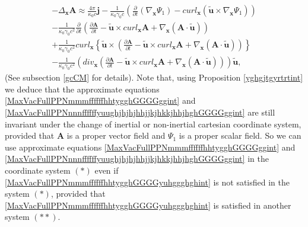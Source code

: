 \documentclass{article}
\theoremstyle{definition}
\theoremstyle{remark}
\renewcommand{\vec}[1]{\mathbf{#1}}
\newcommand{\er}{\eqref}
\newcommand{\er}{\eqref}
\begin{document}
\begin{multline}\label{MaxVacFullPPNnnnffffffyuughjhjhjhhjjkjhkkjhhjhghGGGGggint}
-\Delta_{\vec x}\vec A\approx
%
%
%
\frac{4\pi}{\kappa_0 c}\vec j-\frac{1}{\kappa_0\gamma_0
c}\left(\frac{\partial}{\partial t}\left(\nabla_{\vec
x}\Psi_1\right)-curl_{\vec x}\left(\vec {\tilde u}\times\nabla_{\vec
x}\Psi_1\right)\right)\\-\frac{1}{\kappa_0\gamma_0
c^2}\frac{\partial}{\partial t}\left(\frac{\partial\vec A}{\partial
t}-\vec {\tilde u}\times curl_{\vec x}\vec A+\nabla_{\vec
x}\left(\vec A\cdot\vec {\tilde
u}\right)\right)\\+\frac{1}{\kappa_0\gamma_0 c^2}curl_{\vec x}
\left\{\vec {\tilde u}\times
\left(\frac{\partial\vec A}{\partial t}-\vec {\tilde u}\times
curl_{\vec x}\vec A+\nabla_{\vec x}\left(\vec A\cdot\vec {\tilde
u}\right)\right)\right\}\\-\frac{1}{\kappa_0\gamma_0
c^2}\left(div_{\vec x}\left(\frac{\partial\vec A}{\partial t}-\vec
{\tilde u}\times curl_{\vec x}\vec A+\nabla_{\vec x}\left(\vec
A\cdot\vec {\tilde u}\right)\right)\right)\vec {\tilde u},
\end{multline}
(See subsection \ref{gcCM} for details). Note that, using
Proposition \ref{yghgjtgyrtrtint} we deduce that the approximate
equations \er{MaxVacFullPPNmmmffffffhhtygghGGGGggint} and
\er{MaxVacFullPPNnnnffffffyuughjhjhjhhjjkjhkkjhhjhghGGGGggint} are
still invariant under the change of inertial or non-inertial
cartesian coordinate system, provided that $\vec A$ is a proper
vector field and $\Psi_1$ is a proper scalar field. So we can use
approximate equations \er{MaxVacFullPPNmmmffffffhhtygghGGGGggint}
and \er{MaxVacFullPPNnnnffffffyuughjhjhjhhjjkjhkkjhhjhghGGGGggint}
in the coordinate system $(*)$ even if
\er{MaxVacFullPPNmmmffffffhhtygghGGGGyuhggghghint} is not satisfied
in the system $(*)$, provided that
\er{MaxVacFullPPNmmmffffffhhtygghGGGGyuhggghghint} is satisfied in
another system $(**)$.
\end{document}
